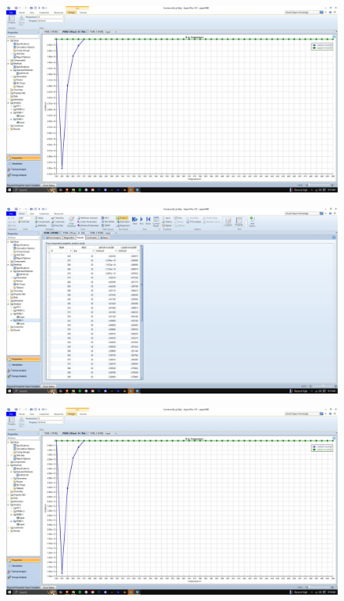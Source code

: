 \documentclass{article}
\begin{document}
\begin{figure}[H]
    \centering
    \includegraphics[width=0.99\textwidth, frame]{img/4 (h graph).JPG}
\end{figure}

\begin{figure}[H]
    \centering
    \includegraphics[width=0.99\textwidth, frame]{img/5 (h table).JPG}
\end{figure}

\begin{figure}[H]
    \centering
    \includegraphics[width=0.99\textwidth, frame]{img/6 (h2bar graph).JPG}
\end{figure}
\end{document}
